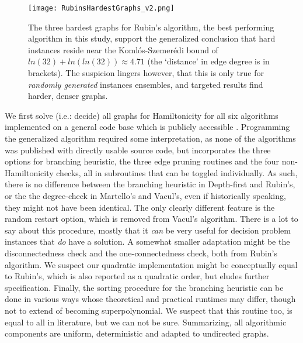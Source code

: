 \documentclass[10pt,conference,compsocconf]{IEEEtran}
\begin{document}
\begin{figure*}[b]
    \centering
    \texttt{[image: RubinsHardestGraphs\_v2.png]}
    \caption{The three hardest graphs for Rubin's algorithm, the best performing algorithm in this study, support the generalized conclusion that hard instances reside near the Koml\'os-Szemer\'edi bound of $ln(32)+ln(ln(32)) \approx 4.71$ (the `distance' in edge degree is in brackets). The suspicion lingers however, that this is only true for \textit{randomly generated} instances ensembles, and targeted results find harder, denser graphs.}
    \label{fig:threehardestgraphs}
\end{figure*}

We first solve (i.e.: decide) all graphs for Hamiltonicity for all six algorithms implemented on a general code base which is publicly accessible \cite{sourcecodejoeri}. Programming the generalized algorithm required some interpretation, as none of the algorithms was published with directly usable source code, but incorporates the three options for branching heuristic, the three edge pruning routines and the four non-Hamiltonicity checks, all in subroutines that can be toggled individually. As such, there is no difference between the branching heuristic in Depth-first and Rubin's, or the the degree-check in Martello's and Vacul's, even if historically speaking, they might not have been identical. The only clearly different feature is the random restart option, which is removed from Vacul's algorithm. There is a lot to say about this procedure, mostly that it \textit{can} be very useful for decision problem instances that \textit{do} have a solution. A somewhat smaller adaptation might be the disconnectedness check and the one-connectedness check, both from Rubin's algorithm. We suspect our quadratic implementation might be conceptually equal to Rubin's, which is also reported as a quadratic order, but eludes further specification. Finally, the sorting procedure for the branching heuristic can be done in various ways whose theoretical and practical runtimes may differ, though not to extend of becoming superpolynomial. We suspect that this routine too, is equal to all in literature, but we can not be sure. Summarizing, all algorithmic components are uniform, deterministic and adapted to undirected graphs. 
\end{document}
